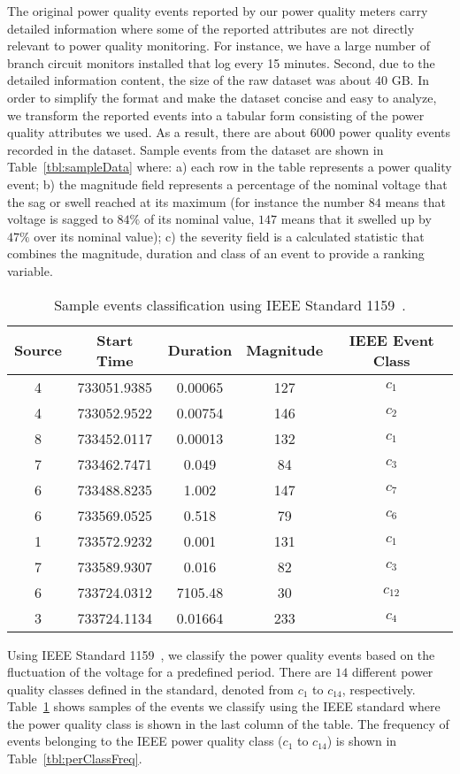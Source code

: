 The original power quality events reported by our power quality meters carry detailed information where some of the reported attributes are not directly relevant to power quality monitoring. For instance, we have a large number of branch circuit monitors installed that log every 15 minutes. Second, due to the detailed information content, the size of the raw dataset was about $40$ GB. In order to simplify the format and make the dataset concise and easy to analyze, we transform the reported events into a tabular form consisting of the power quality attributes we used. As a result, there are about $6000$ power quality events recorded in the dataset. Sample events from the dataset are shown in Table~\ref{tbl:sampleData} where: a) each row in the table represents a power quality event; b) the magnitude field represents a percentage of the nominal voltage that the sag or swell reached at its maximum (for instance the number $84$ means that voltage is sagged to $84\%$ of its nominal value, $147$ means that it swelled up by $47\%$ over its nominal value); c) the severity field is a calculated statistic that combines the magnitude, duration and class of an event to provide a ranking variable. 

\begin{table}[!t]
\caption{Sample events classification using IEEE Standard 1159~\cite{IEEE09_1159}.}
\centering 
\begin{tabular}{|c|c|c|c|c|}
\hline Source & Start Time & Duration & Magnitude & IEEE Event Class\tabularnewline
\hline 4 & 733051.9385 & 0.00065 & 127 & $c_1$\tabularnewline
 4 & 733052.9522 & 0.00754 & 146 & $c_2$\tabularnewline
 8 & 733452.0117 & 0.00013 & 132 & $c_1$\tabularnewline
 7 & 733462.7471 & 0.049 & 84 & $c_3$\tabularnewline
 6 & 733488.8235 & 1.002 & 147 & $c_7$\tabularnewline
 6 & 733569.0525 & 0.518 & 79 & $c_6$\tabularnewline
 1 & 733572.9232 & 0.001 & 131 & $c_1$\tabularnewline
 7 & 733589.9307 & 0.016 & 82 & $c_3$\tabularnewline
 6 & 733724.0312 & 7105.48 & 30 & $c_{12}$\tabularnewline
 3 & 733724.1134 & 0.01664 & 233 & $c_4$\tabularnewline
\hline 
\end{tabular}
\label{tbl:sampleClassData}
\end{table}

Using IEEE Standard 1159~\cite{IEEE09_1159}, we classify the power quality events based on the fluctuation of the voltage for a predefined period. There are $14$ different power quality classes defined in the standard, denoted from $c_1$ to $c_{14}$, respectively. Table~\ref{tbl:sampleClassData} shows samples of the events we classify using the IEEE standard where the power quality class is shown in the last column of the table. The frequency of events belonging to the IEEE power quality class ($c_1$ to $c_{14}$) is shown in Table~\ref{tbl:perClassFreq}.

